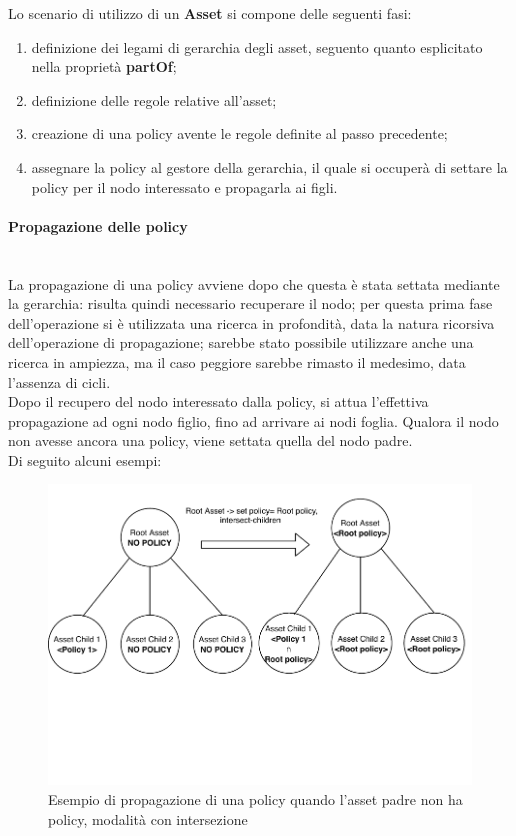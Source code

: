 \documentclass[12pt,a4paper,twoside]{book}
\begin{document}
Lo scenario di utilizzo di un \textbf{Asset} si compone delle seguenti fasi:
\begin{enumerate}
\item definizione dei legami di gerarchia degli asset, seguento quanto esplicitato nella proprietà \textbf{partOf};
\item definizione delle regole relative all'asset;
\item creazione di una policy avente le regole definite al passo precedente;
\item assegnare la policy al gestore della gerarchia, il quale si occuperà di settare la policy per il nodo interessato e propagarla ai figli.
\end{enumerate}
\paragraph{Propagazione delle policy}\label{propagation}\mbox{}\\
La propagazione di una policy avviene dopo che questa è stata settata mediante la gerarchia: risulta quindi necessario recuperare il nodo; per questa prima fase dell'operazione si è utilizzata una ricerca in profondità, data la natura ricorsiva dell'operazione di propagazione; sarebbe stato possibile utilizzare anche una ricerca in ampiezza, ma il caso peggiore sarebbe rimasto il medesimo, data l'assenza di cicli.\\
Dopo il recupero del nodo interessato dalla policy, si attua l'effettiva propagazione ad ogni nodo figlio, fino ad arrivare ai nodi foglia. Qualora il nodo non avesse ancora una policy, viene settata quella del nodo padre.\\
Di seguito alcuni esempi:
\begin{figure}[H]
\centering
\includegraphics[scale=.70]{../immagini/assetSetPropagation.pdf}
\caption{Esempio di propagazione di una policy quando l'asset padre non ha policy, modalità con intersezione}
\label{imgAssetPropSet}
\end{figure}
\end{document}
